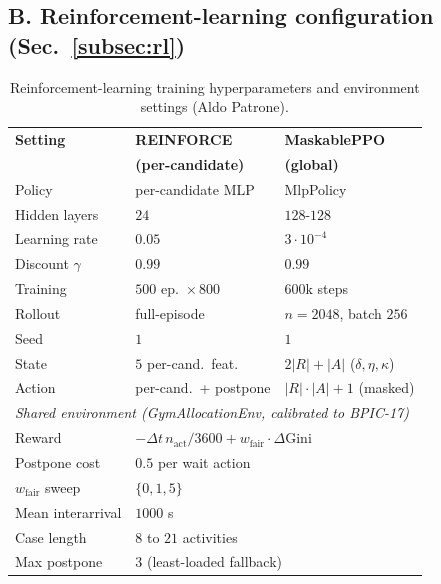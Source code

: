 \subsection*{B. Reinforcement-learning configuration (Sec.~\ref{subsec:rl})}
\begin{table}[H]
    \caption{Reinforcement-learning training hyperparameters and environment settings
    (Aldo Patrone).}
    \centering
    \renewcommand{\arraystretch}{1.2}
    \tiny
    \begin{tabular}{lll}
        \toprule
        \textbf{Setting} & \textbf{REINFORCE} & \textbf{MaskablePPO} \\
                         & \textbf{(per-candidate)} & \textbf{(global)} \\
        \midrule
        Policy        & per-candidate MLP & MlpPolicy \\
        Hidden layers & $24$ & $128$-$128$ \\
        Learning rate & $0.05$ & $3\cdot10^{-4}$ \\
        Discount $\gamma$ & $0.99$ & $0.99$ \\
        Training      & $500$ ep.\ $\times\,800$ & $600\mathrm{k}$ steps \\
        Rollout       & full-episode & $n=2048$, batch $256$ \\
        Seed          & $1$ & $1$ \\
        State         & $5$ per-cand.\ feat. & $2|R|{+}|A|$ ($\delta,\eta,\kappa$) \\
        Action        & per-cand.\ + postpone & $|R|{\cdot}|A|{+}1$ (masked) \\
        \midrule
        \multicolumn{3}{l}{\textit{Shared environment (GymAllocationEnv, calibrated to BPIC-17)}} \\
        Reward                 & \multicolumn{2}{l}{$-\Delta t\,n_{\mathrm{act}}/3600 + w_{\mathrm{fair}}\!\cdot\!\Delta\mathrm{Gini}$} \\
        Postpone cost          & \multicolumn{2}{l}{$0.5$ per wait action} \\
        $w_{\mathrm{fair}}$ sweep & \multicolumn{2}{l}{$\{0,1,5\}$} \\
        Mean interarrival      & \multicolumn{2}{l}{$1000$ s} \\
        Case length            & \multicolumn{2}{l}{$8$ to $21$ activities} \\
        Max postpone           & \multicolumn{2}{l}{$3$ (least-loaded fallback)} \\
        \bottomrule
    \end{tabular}
    \label{tab:rl_hparams}
\end{table}

